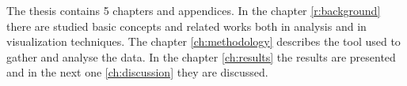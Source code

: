 
The thesis contains 5 chapters and appendices. In the chapter \ref{r:background} there are studied basic concepts and related works both in analysis and in visualization techniques. The chapter \ref{ch:methodology} describes the tool used to gather and analyse the data. In the chapter \ref{ch:results} the results are presented and in the next one \ref{ch:discussion} they are discussed.




